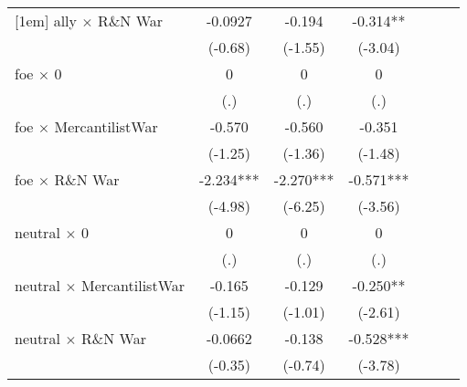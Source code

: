 {\begin{tabular}{l*{6}{c}}
[1em]
ally $\times$ R\&N War&     -0.0927         &      -0.194         &      -0.314** &                     &                     &                     \\
                    &     (-0.68)         &     (-1.55)         &     (-3.04)         &                     &                     &                     \\
[1em]
foe $\times$ 0      &           0         &           0         &           0         &                     &                     &                     \\
                    &         (.)         &         (.)         &         (.)         &                     &                     &                     \\
[1em]
foe $\times$ MercantilistWar&      -0.570         &      -0.560         &      -0.351         &                     &                     &                     \\
                    &     (-1.25)         &     (-1.36)         &     (-1.48)         &                     &                     &                     \\
[1em]
foe $\times$ R\&N War&      -2.234***&      -2.270***&      -0.571***&                     &                     &                     \\
                    &     (-4.98)         &     (-6.25)         &     (-3.56)         &                     &                     &                     \\
[1em]
neutral $\times$ 0  &           0         &           0         &           0         &                     &                     &                     \\
                    &         (.)         &         (.)         &         (.)         &                     &                     &                     \\
[1em]
neutral $\times$ MercantilistWar&      -0.165         &      -0.129         &      -0.250** &                     &                     &                     \\
                    &     (-1.15)         &     (-1.01)         &     (-2.61)         &                     &                     &                     \\
[1em]
neutral $\times$ R\&N War&     -0.0662         &      -0.138         &      -0.528***&                     &                     &                     \\
                    &     (-0.35)         &     (-0.74)         &     (-3.78)         &                     &                     &                     \\

\end{tabular}}
